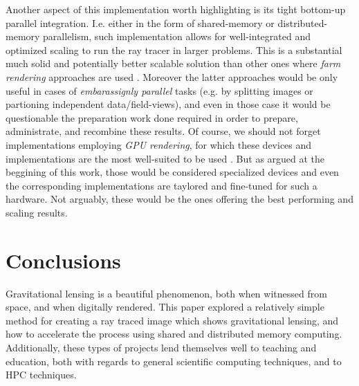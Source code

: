 Another aspect of this implementation worth highlighting is its tight bottom-up parallel integration.
I.e. either in the form of shared-memory or distributed-memory parallelism, such implementation
allows for well-integrated and optimized scaling to run the ray tracer in larger problems.
This is a substantial much solid and potentially better scalable solution than other ones
where \textit{farm rendering} approaches are used \cite{10.1145/3528223.3530171,app112412046}.
Moreover the latter approaches would be only useful in cases of \textit{embarassignly parallel}
tasks (e.g. by splitting images or partioning independent data/field-views),
and even in those case it would be questionable the preparation work done required in order to
prepare, administrate, and recombine these results.
Of course, we should not forget implementations employing \textit{GPU rendering}, for which
these devices and implementations are the most well-suited to be used \cite{Peddie2019_hardware}.
But as argued at the beggining of this work, those would be considered specialized devices
and even the corresponding implementations are taylored and fine-tuned for such a hardware.
Not arguably, these would be the ones offering the best performing and scaling results.








\section{Conclusions}
\label{sec:concl}

Gravitational lensing is a beautiful phenomenon, both when witnessed from space, and when digitally rendered. This paper explored a relatively simple method for creating a ray traced image which shows gravitational lensing, and how to accelerate the process using shared and distributed memory computing. Additionally, these types of projects lend themselves well to teaching and education, both with regards to general scientific computing techniques, and to HPC techniques.


